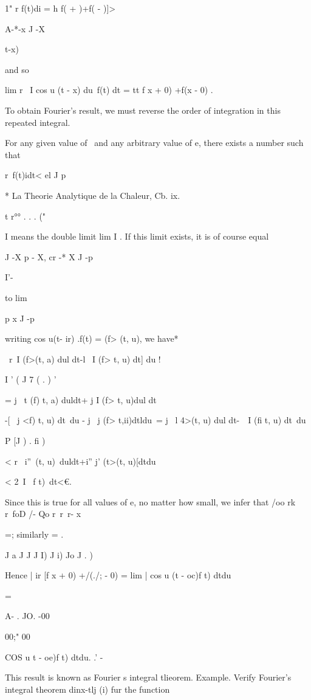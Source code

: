 {1" r f(t)di = h f( + )+f( - )]>

A-*-x J -X

 t-x)

and so

lim r \ I cos u (t - x) du\ f(t) dt = tt f x + 0) +f(x - 0) .

To obtain Fourier's result, we must reverse the order of integration
in this repeated integral.

For any given value of \ and any arbitrary value of e, there exists a
number such that

r\ f(t)idt< el J p

* La Theorie Analytique de la Chaleur, Cb. ix.

t r°° . . . ("

I means the double limit lim I . If this limit exists, it is of course
equal

J -X p -  X, cr -* X J -p

I'-

to lim

p x J -p

%
%

writing cos u(t- ir) .f(t) = (f> (t, u), we have*

\ r\ I (f>(t, a) dul dt-l \ I (f> t, u) dt] du !

I ' ( J 7 ( . ) '

= j \ t (f) t, a) duldt+ j I (f> t, u)dul dt

-[ \ j <f) t, u) dt\ du - j \ j (f> t,ii)dtldu\ = j \ l 4>(t, u) dul
dt-\ \ I (fi t, u) dt\ du

  P [J ) . fi )

< r \ i''\ < t>(t, u)\ duldt+i'' j' (t>(t, u)[dtdu

< 2\ I \ f t)\ dt<€.

Since this is true for all values of e, no matter how small, we infer
that /oo rk r\ foD /- Qo r\ r\ r- x

=; similarly = .

J a J J J I) J i) Jo J . )

Hence | ir [f x + 0) +/(./; - 0) = lim | cos u (t - oc)f t) dtdu

=

A- . JO. -00

00;" 00

COS u t - oe)f t) dtdu. .' -

This result is known as Fourier s integral tlieorem. Example. Verify
Fourier's integral theorem dinx-tlj (i) fur the function

}
